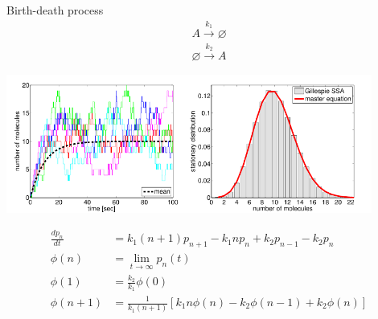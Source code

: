 \begin{frame}
Birth-death process \hfill \cite{Erban2007}
{\scriptsize
\begin{align*}
A \xrightarrow{k_1} \varnothing\\
\varnothing \xrightarrow{k_2} A
\end{align*}}
\begin{center}
\includegraphics[width=0.9\textwidth]{fig/stochsimbirthdeathprocess.pdf}\\
\end{center}
{\scriptsize
\begin{align*}
\frac{dp_n}{dt}&=k_1(n+1)p_{n+1} - k_1 n p_n + k_2 p_{n-1} - k_2 p_n\\
\phi(n) &= \lim_{t\rightarrow\infty}p_n(t)\\
\phi(1) &= \frac{k_2}{k_1} \phi(0)\\
\phi(n+1) &= \frac{1}{k_1(n+1)}\left[k_1 n \phi(n) - k_2 \phi(n-1) + k_2 \phi(n) \right]
\end{align*}}
\end{frame}
